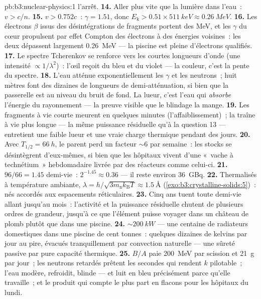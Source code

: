 \begin{solution}{pb:b3:nuclear-physics:1}
l'arrêt.
\textbf{14.} Aller plus vite que la lumière dans l'eau~: $v > c/n$.
\textbf{15.} $v > 0.752c$~: $\gamma = 1.51$, donc $E_{\text{k}} >
0.51\times\qty{511}{keV} \approx \qty{0.26}{MeV}$.
\textbf{16.} Les électrons $\beta$ issus des désintégrations de
fragments portent des \unit{MeV}, et les $\gamma$ du cœur propulsent
par effet Compton des électrons à des énergies voisines~: les deux
dépassent largement \qty{0.26}{MeV} --- la piscine est pleine
d'électrons qualifiés.
\textbf{17.} Le spectre Tcherenkov se renforce vers les courtes
longueurs d'onde (une intensité $\propto1/\lambda^2$)~: l'œil reçoit
du bleu et du violet --- la couleur, c'est la pente du spectre.
\textbf{18.} L'eau atténue exponentiellement les $\gamma$ et les
neutrons~; huit mètres font des dizaines de longueurs de
demi-atténuation, si bien que la passerelle est au niveau du bruit de
fond. La lueur, c'est l'eau qui \emph{absorbe} l'énergie du
rayonnement --- la preuve visible que le blindage la mange.
\textbf{19.} Les fragments à vie courte meurent en quelques minutes
(l'affaiblissement)~; la traîne à vie plus longue --- la même
puissance résiduelle qu'à la question 13 --- entretient une faible
lueur et une vraie charge thermique pendant des jours.
\textbf{20.} Avec $T_{1/2} = \qty{66}{h}$, le parent perd un facteur
${\sim}6$ par semaine~: les stocks se désintègrent d'eux-mêmes, si
bien que les hôpitaux vivent d'une «~vache à technétium~»
hebdomadaire livrée par des réacteurs comme celui-ci.
\textbf{21.} $96/66 = 1.45$ demi-vie~: $2^{-1.45} \approx
0.36$ --- il reste environ \qty{36}{GBq}.
\textbf{22.} Thermalisés à température ambiante, $\lambda =
h/\sqrt{3m_{\text{n}}k_{\text{B}}T} \approx \qty{1.5}{\angstrom}$
(\cref{exo:b3:crystalline-solids:5})~: nés accordés aux espacements
réticulaires.
\textbf{23.} Cinq ans tuent toute demi-vie allant jusqu'au mois~:
l'activité et la puissance résiduelle chutent de plusieurs ordres de
grandeur, jusqu'à ce que l'élément puisse voyager dans un château de
plomb plutôt que dans une piscine.
\textbf{24.} ${\sim}\qty{200}{kW}$ --- une centaine de radiateurs
domestiques dans une piscine de cent tonnes~: quelques dizaines de
kelvins par jour au pire, évacués tranquillement par convection
naturelle --- une sûreté passive par pure capacité thermique.
\textbf{25.} $B/A$ paie \qty{200}{MeV} par scission et \qty{21}{g}
par jour~; les neutrons retardés prêtent les secondes qui rendent $k$
pilotable~; l'eau modère, refroidit, blinde --- et luit en bleu
précisément parce qu'elle travaille~; et le produit qui compte le
plus part en flacons pour les hôpitaux du lundi.
\end{solution}
